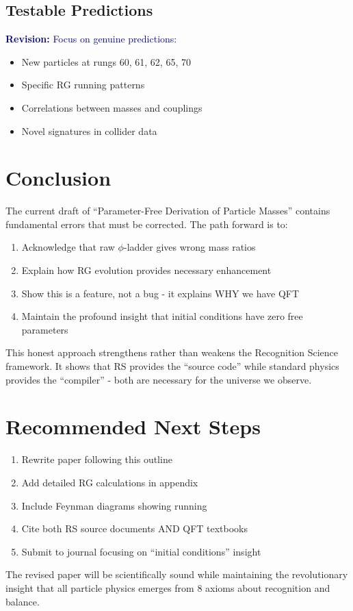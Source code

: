 \documentclass[12pt,a4paper]{article}
\newcommand{\revision}[1]{\textcolor{darkblue}{\textbf{Revision: }#1}}
\begin{document}
\subsection{Testable Predictions}

\revision{Focus on genuine predictions:}
\begin{itemize}
\item New particles at rungs 60, 61, 62, 65, 70
\item Specific RG running patterns
\item Correlations between masses and couplings
\item Novel signatures in collider data
\end{itemize}

\section{Conclusion}

The current draft of ``Parameter-Free Derivation of Particle Masses'' contains fundamental errors that must be corrected. The path forward is to:

\begin{enumerate}
\item Acknowledge that raw $\phi$-ladder gives wrong mass ratios
\item Explain how RG evolution provides necessary enhancement
\item Show this is a feature, not a bug - it explains WHY we have QFT
\item Maintain the profound insight that initial conditions have zero free parameters
\end{enumerate}

This honest approach strengthens rather than weakens the Recognition Science framework. It shows that RS provides the ``source code'' while standard physics provides the ``compiler'' - both are necessary for the universe we observe.

\section{Recommended Next Steps}

\begin{enumerate}
\item Rewrite paper following this outline
\item Add detailed RG calculations in appendix
\item Include Feynman diagrams showing running
\item Cite both RS source documents AND QFT textbooks
\item Submit to journal focusing on ``initial conditions'' insight
\end{enumerate}

The revised paper will be scientifically sound while maintaining the revolutionary insight that all particle physics emerges from 8 axioms about recognition and balance.
\end{document}
